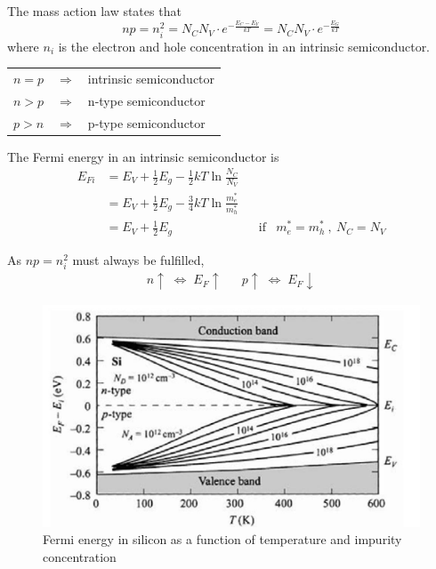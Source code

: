 The mass action law states that
\begin{equation}
    n p = n_i^2 = N_C N_V \cdot e^{-\frac{E_C-E_V}{k T}} = N_C N_V \cdot e^{-\frac{E_G}{k T}}
\end{equation}
where $n_i$ is the electron and hole concentration in an intrinsic semiconductor.

\begin{table}[hbp!]
    \centering
    \begin{tabular}{lll}
        $n = p$ & $\Rightarrow$ & intrinsic semiconductor \\
        $n > p$ & $\Rightarrow$ & n-type semiconductor \\
        $p > n$ & $\Rightarrow$ & p-type semiconductor \\
    \end{tabular}
\end{table}

The Fermi energy in an intrinsic semiconductor is
\begin{align}
    E_{Fi} &= E_V + \frac{1}{2} E_g - \frac{1}{2} k T \ln \frac{N_C}{N_V} \\
    &= E_V + \frac{1}{2} E_g - \frac{3}{4} k T \ln \frac{m_e^*}{m_h^*} \\
    &= E_V + \frac{1}{2} E_g && \text{if} & m_e^*=m_h^* \:,\: N_C = N_V
\end{align}

As $np = n_i^2$ must always be fulfilled,
\begin{align*}
    n \uparrow \;\Leftrightarrow\; E_F \uparrow && p \uparrow \;\Leftrightarrow\; E_F \downarrow
\end{align*}

\begin{figure}[htbp]
    \centering
    \includegraphics[width=0.6\linewidth]{images/semiconductors_fermi_energies.jpg}
    \caption{Fermi energy in silicon as a function of temperature and impurity concentration}
\end{figure}